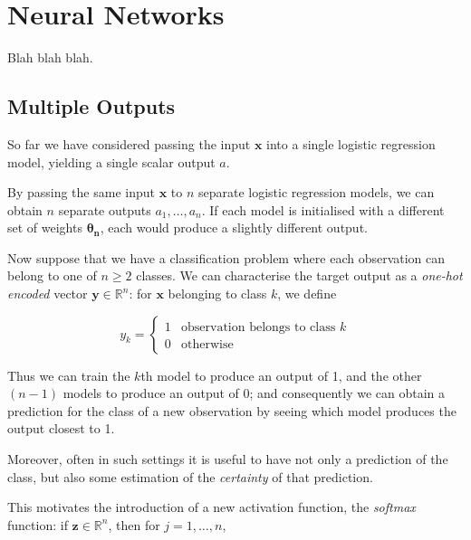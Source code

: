 \documentclass{article}[11pt]
\begin{document}
\section{Neural Networks}
    
    Blah blah blah.
    
    
    

    \subsection{Multiple Outputs}
    
        So far we have considered passing the input $\mathbf{x}$ into a single logistic regression model, yielding a single scalar output $a$.
    
        By passing the same input $\mathbf{x}$ to $n$ separate logistic regression models, we can obtain $n$ separate outputs $a_1, \ldots, a_n$. If each model is initialised with a different set of weights $\boldsymbol{\theta_n}$, each would produce a slightly different output.
        
        Now suppose that we have a classification problem where each observation can belong to one of $n \geq 2$ classes. We can characterise the target output as a \textit{one-hot encoded} vector $\mathbf{y} \in \mathbb{R}^n$: for $\mathbf{x}$ belonging to class $k$, we define
        
        $$
        y_k = \begin{cases}
            1 & \text{observation belongs to class } k \\
            0 & \text{otherwise}
        \end{cases}
        $$
        
        Thus we can train the $k$th model to produce an output of 1, and the other $(n-1)$ models to produce an output of 0; and consequently we can obtain a prediction for the class of a new observation by seeing which model produces the output closest to 1.

        Moreover, often in such settings it is useful to have not only a prediction of the class, but also some estimation of the \textit{certainty} of that prediction.
        
        This motivates the introduction of a new activation function, the \textit{softmax} function: if $\mathbf{z} \in \mathbb{R}^n$, then for $j = 1, \ldots, n$,
        
\end{document}
